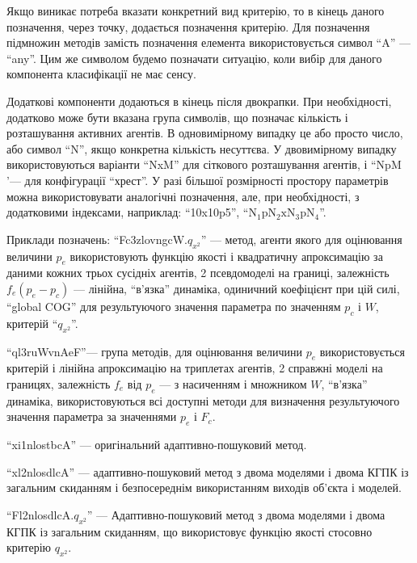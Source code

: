Якщо виникає потреба вказати конкретний вид критерію, то в кінець даного
позначення, через точку, додається позначення критерію.
Для позначення підмножин методів замість позначення елемента використовується символ ``A'' --- ``any''.
Цим же символом будемо позначати ситуацію, коли вибір для даного
компонента класифікації не має сенсу.

Додаткові компоненти додаються в кінець після двокрапки. При
необхідності, додатково може бути вказана група символів, що
позначає кількість і розташування активних агентів.
В одновимірному випадку це або просто число, або символ ``N'',
якщо конкретна кількість несуттєва. У двовимірному випадку
використовуються варіанти ``NxM'' для сіткового розташування
агентів, і ``NpM '--- для конфігурації ``хрест''. У разі більшої
розмірності простору параметрів можна використовувати
аналогічні позначення, але, при необхідності, з додатковими
індексами, наприклад:
``10x10p5'', ``$\mathrm{N_1 p N_2 x N_3 p N_4}$''.

Приклади позначень:
``Fc3zlovngcW.$q_{x^2}$''
--- метод, агенти якого для оцінювання величини $p_e$ використовують функцію
якості і квадратичну апроксимацію за даними кожних трьох сусідніх агентів, 2
псевдомоделі на границі, залежність $f_e(p_e-p_c)$ --- лінійна, ``в'язка''
динаміка, одиничний коефіцієнт при цій силі, ``global COG'' для результуючого
значення параметра по значенням $p_c$ і $W$, критерій
``$q_{x^2}$''.



``ql3ruWvnAeF''---
група методів, для оцінювання величини
$p_e$ використовується критерій і лінійна апроксимацію на
триплетах агентів, 2 справжні моделі на границях, залежність
$f_e$ від $ p_e$ --- з насиченням і множником
$W$, ``в'язка'' динаміка, використовуються всі доступні методи
для визначення результуючого значення параметра за значеннями  $p_e$ і $F_c$.

``xi1nlostbcA'' ---
оригінальний адаптивно-пошуковий метод.

``xl2nlosdlcA'' ---
адаптивно-пошуковий метод з двома моделями і двома КГПК із
загальним скиданням і безпосереднім використанням виходів
об'єкта і моделей.

``Fl2nlosdlcA.$q_{x^2}$'' ---
Адаптивно-пошуковий метод з двома моделями і двома КГПК із
загальним скиданням, що використовує функцію якості стосовно
критерію $q_{x^2}$.




